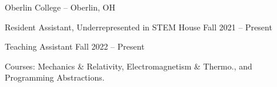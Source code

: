 \begin{entry}{Oberlin College -- Oberlin, OH}



	\entryItem
		{Resident Assistant, Underrepresented in STEM House}
		{Fall 2021 -- Present}

	\entryItem
		{Teaching Assistant}
		{Fall 2022 -- Present}

		\begin{items}
			\item Courses: Mechanics \& Relativity, Electromagnetism \& Thermo., and Programming Abstractions.
		\end{items}
		\vspace*{-0.2cm}

	
\end{entry}
